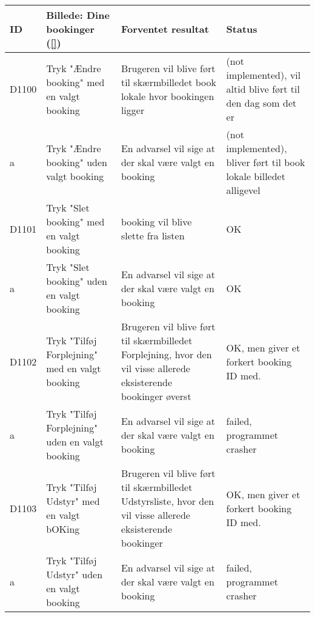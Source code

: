 \begin{longtable}{ |p{0.85cm}| p{7cm} | p{7.15cm} | p{1cm} | }
\hline
ID & Billede: Dine bookinger (\ref{})  & Forventet resultat & Status\\ 
\hline
D1100 & Tryk "Ændre booking" med en valgt booking & Brugeren vil blive ført til skærmbilledet book lokale hvor bookingen ligger &(not implemented), vil altid blive ført til den dag som det er \\
\hline
a & Tryk "Ændre booking" uden valgt booking & En advarsel vil sige at der skal være valgt en booking &(not implemented), bliver ført til book lokale billedet alligevel \\
\hline
D1101 & Tryk "Slet booking" med en valgt booking & booking vil blive slette fra listen & OK \\
\hline
a & Tryk "Slet booking" uden en valgt booking & En advarsel vil sige at der skal være valgt en booking & OK \\
\hline
D1102 & Tryk "Tilføj Forplejning" med en valgt booking & Brugeren vil blive ført til skærmbilledet Forplejning, hvor den vil visse allerede eksisterende bookinger øverst & OK, men giver et forkert booking ID med. \\
\hline
a &  Tryk "Tilføj Forplejning" uden en valgt booking & En advarsel vil sige at der skal være valgt en booking &failed, programmet crasher \\
\hline
D1103 & Tryk "Tilføj Udstyr" med en valgt bOKing & Brugeren vil blive ført til skærmbilledet Udstyrsliste, hvor den vil visse allerede eksisterende bookinger & OK, men giver et forkert booking ID med. \\
\hline
a & Tryk "Tilføj Udstyr" uden en valgt booking & En advarsel vil sige at der skal være valgt en booking & failed, programmet crasher \\
\hline
\end{longtable}